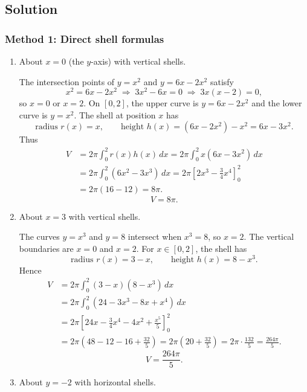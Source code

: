 \documentclass[12pt]{article}
\begin{document}
\subsection*{Solution}

\subsubsection*{Method 1: Direct shell formulas}

\begin{enumerate}[label=(\alph*)]
\item About \(x=0\) (the \(y\)-axis) with vertical shells.

The intersection points of \(y=x^{2}\) and \(y=6x-2x^{2}\) satisfy
\[
x^{2} = 6x - 2x^{2}
\;\Rightarrow\;
3x^{2}-6x=0
\;\Rightarrow\;
3x(x-2)=0,
\]
so \(x=0\) or \(x=2\). On \([0,2]\), the upper curve is \(y=6x-2x^{2}\) and the lower curve is \(y=x^{2}\). The shell at position \(x\) has
\[
\text{radius } r(x)=x,\qquad
\text{height } h(x)=(6x-2x^{2})-x^{2}=6x-3x^{2}.
\]
Thus
\begin{align*}
V
&=2\pi\int_{0}^{2} r(x)h(x)\,dx
=2\pi\int_{0}^{2} x(6x-3x^{2})\,dx\\
&=2\pi\int_{0}^{2}(6x^{2}-3x^{3})\,dx
=2\pi\left[2x^{3}-\frac{3}{4}x^{4}\right]_{0}^{2}\\
&=2\pi\left(16-12\right)=8\pi.
\end{align*}
\[
\boxed{V=8\pi.}
\]

\item About \(x=3\) with vertical shells.

The curves \(y=x^{3}\) and \(y=8\) intersect when \(x^{3}=8\), so \(x=2\). The vertical boundaries are \(x=0\) and \(x=2\). For \(x\in[0,2]\), the shell has
\[
\text{radius } r(x)=3-x,\qquad
\text{height } h(x)=8-x^{3}.
\]
Hence
\begin{align*}
V
&=2\pi\int_{0}^{2}(3-x)(8-x^{3})\,dx\\
&=2\pi\int_{0}^{2}\left(24-3x^{3}-8x+x^{4}\right)\,dx\\
&=2\pi\left[24x-\frac{3}{4}x^{4}-4x^{2}+\frac{x^{5}}{5}\right]_{0}^{2}\\
&=2\pi\left(48-12-16+\frac{32}{5}\right)
=2\pi\left(20+\frac{32}{5}\right)
=2\pi\cdot \frac{132}{5}
=\frac{264\pi}{5}.
\end{align*}
\[
\boxed{V=\dfrac{264\pi}{5}.}
\]

\item About \(y=-2\) with horizontal shells.


\end{enumerate}
\end{document}
